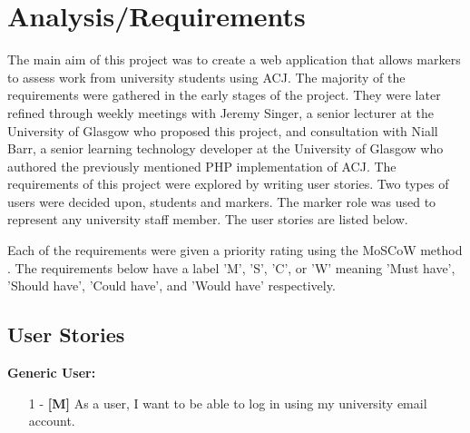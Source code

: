 \documentclass{l4proj}
\begin{document}
\chapter{Analysis/Requirements}
The main aim of this project was to create a web application that allows markers to assess work from university students using ACJ. The majority of the requirements were gathered in the early stages of the project. They were later refined through weekly meetings with Jeremy Singer, a senior lecturer at the University of Glasgow who proposed this project, and consultation with Niall Barr, a senior learning technology developer at the University of Glasgow who authored the previously mentioned PHP implementation of ACJ. The requirements of this project were explored by writing user stories. Two types of users were decided upon, students and markers. The marker role was used to represent any university staff member. The user stories are listed below.

Each of the requirements were given a priority rating using the MoSCoW method \citep{moscow}. The requirements below have a label 'M', 'S', 'C', or 'W' meaning 'Must have', 'Should have', 'Could have', and 'Would have' respectively.


\section{User Stories}
\textbf{Generic User:}
\begin{itemize}
    \item
        [1] - \textbf{[M]}  As a user, I want to be able to log in using my university email account.
\end{itemize}
\end{document}
